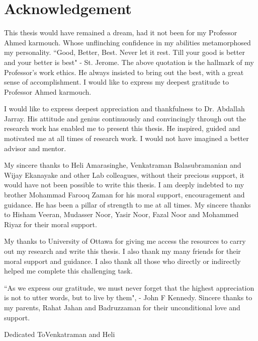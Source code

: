\documentclass[12pt,english,oneside,letterpaper]{report}
\newenvironment{dedication}
  {\clearpage           %
   \thispagestyle{empty}%
   \vspace*{\stretch{1}}%
   \itshape             %
   \centering          %
  }
  {\par %
   \vspace{\stretch{1}} %
   \clearpage           %
  }
\begin{document}
\chapter*{Acknowledgement}
\vspace{-12mm}
This thesis would have remained a dream, had it not been for my Professor Ahmed karmouch. Whose unflinching confidence in my abilities metamorphosed my personality. ``Good, Better, Best. Never let it rest. Till your good is better and your better is best" - St. Jerome. The above quotation is the hallmark of my Professor's work ethics. He always insisted to bring out the best, with a great sense of accomplishment. I would like to express my deepest gratitude to Professor Ahmed karmouch.\par
I would like to express deepest appreciation and thankfulness to Dr. Abdallah Jarray. His attitude and genius continuously and convincingly through out the research work has enabled me to present this thesis. He inspired, guided and motivated me at all times of research work. I would not have imagined a better advisor and mentor.\par
My sincere thanks to Heli Amarasinghe, Venkatraman Balasubramanian and Wijay Ekanayake and other Lab colleagues, without their precious support, it would have not been possible to write this thesis. I am deeply indebted to my brother Mohammad Farooq Zaman for his moral support, encouragement and guidance. He has been a pillar of strength to me at all times. My sincere thanks to Hisham Veeran, Mudasser Noor, Yasir Noor, Fazal Noor and Mohammed Riyaz  for their moral support.\par
My thanks to University of Ottawa for giving me access the resources to carry out my research and write this thesis. I also thank my many friends for their moral support and guidance. I also thank all those who directly or indirectly helped me complete this challenging task.\par
``As we express our gratitude, we must never forget that the highest appreciation is not to utter words, but to live by them", - John F Kennedy. Sincere thanks to my parents, Rahat Jahan and Badruzzaman for their unconditional love and support.\par
\clearpage

\begin{dedication}
Dedicated ToVenkatraman and Heli
\end{dedication}
\let\cleardoublepage\clearpage
\end{document}
